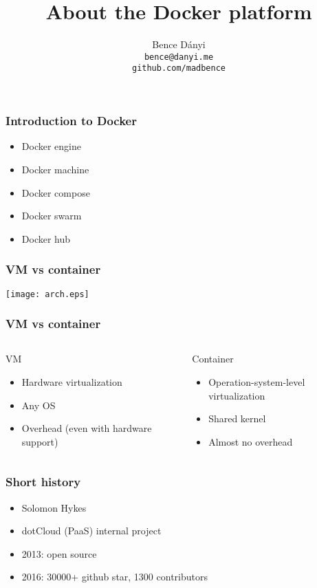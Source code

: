 \documentclass[xetex,mathserif,serif]{beamer}
\title{About the Docker platform}
\author{Bence Dányi\\\vspace{1cm}\tiny{\texttt{bence@danyi.me\\github.com/madbence}}}
\begin{document}
  \frame{\titlepage}
  \begin{frame}
    \frametitle{Introduction to Docker}
    \begin{itemize}
      \item Docker engine
      \item Docker machine
      \item Docker compose
      \item Docker swarm
      \item Docker hub
    \end{itemize}
  \end{frame}
  \begin{frame}
    \frametitle{VM vs container}
    \texttt{[image: arch.eps]}
  \end{frame}
  \begin{frame}
    \frametitle{VM vs container}
    \begin{columns}
      \begin{column}{0.5\textwidth}
        VM
        \begin{itemize}
          \item Hardware virtualization
          \item Any OS
          \item Overhead (even with hardware support)
        \end{itemize}
      \end{column}
      \begin{column}{0.5\textwidth}
        Container
        \begin{itemize}
          \item Operation-system-level virtualization
          \item Shared kernel
          \item Almost no overhead
        \end{itemize}
      \end{column}
    \end{columns}
  \end{frame}
  \begin{frame}
    \frametitle{Short history}
    \begin{itemize}
      \item Solomon Hykes
      \item dotCloud (PaaS) internal project
      \item 2013: open source
      \item 2016: 30000+ github star, 1300 contributors
    \end{itemize}
  \end{frame}
\end{document}
